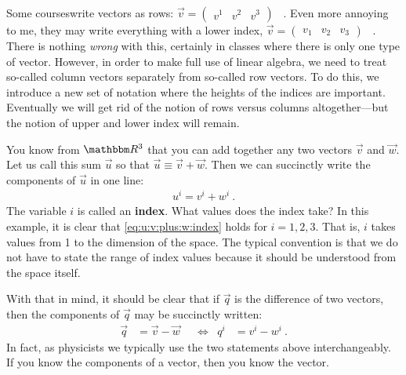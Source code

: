 \begin{example}
Some courses\sidenotemark write vectors as rows: $\vec{v}=\begin{pmatrix}
    v^1 & v^2 & v^3
\end{pmatrix}$ \ . Even more annoying to me, they may write everything with a lower index, $\vec{v}=\begin{pmatrix}
    v_1 & v_2 & v_3
\end{pmatrix}$ \ . There is nothing \emph{wrong} with this, certainly in classes where there is only one type of vector. However, in order to make full use of linear algebra, we need to treat so-called column vectors separately from so-called row vectors. To do this, we introduce a new set of notation where the heights of the indices are important. Eventually we will get rid of the notion of rows versus columns altogether---but the notion of upper and lower index will remain.
\end{example}


You know from $\RR ^3$ that you can add together any two vectors $\vec{v}$ and $\vec{w}$.
% 
Let us call this sum $\vec{u}$ so that $\vec{u}\equiv \vec{v}+\vec{w}$. Then we can succinctly write the components of $\vec{u}$ in one line:
\begin{align}
    u^i = v^i + w^i \ .
    \label{eq:u:v:plus:w:index}
\end{align}
The variable $i$ is called an \textbf{index}. What values does the index take? In this example, it is 
clear that \eqref{eq:u:v:plus:w:index} holds for $i=1,2,3$. That is, $i$ takes values from 1 to the dimension of the space. The typical convention is that we do not have to state the range of index values because it should be understood from the space itself. 

With that in mind, it should be clear that if $\vec{q}$ is the difference of two vectors, then the components of $\vec{q}$ may be succinctly written:
\begin{align}
\vec{q} &= \vec{v}-\vec{w}    
&
&\Leftrightarrow
&
q^i &= v^i - w^i \ .
\end{align}
In fact, as physicists we typically use the two statements above interchangeably. If you know the components of a vector, then you know the vector.


